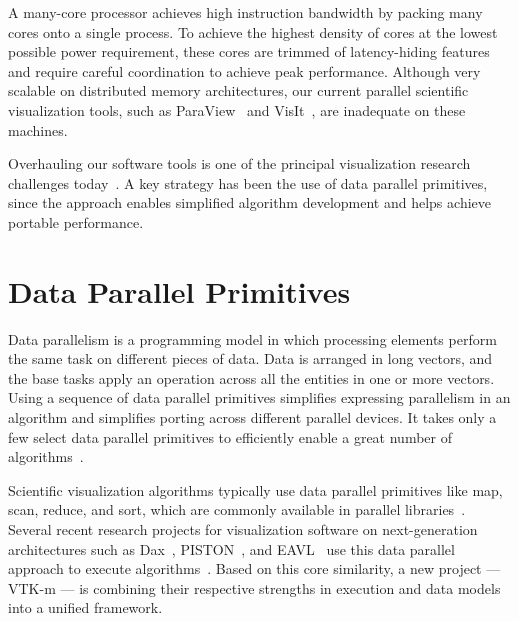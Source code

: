 \documentclass{superfri}
\newcommand*{\lcite}[1]{~\cite{#1}}
\newcommand{\fix}[1]{{\color{red}\textsc{[#1]}}}
\begin{document}
A many-core processor achieves high instruction bandwidth by packing many
cores onto a single process. To achieve the highest density of cores at the
lowest possible power requirement, these cores are trimmed of
latency-hiding features and require careful coordination to achieve peak
performance. Although very scalable on distributed memory architectures,
our current parallel scientific visualization tools, 
such as ParaView\lcite{ParaView} and VisIt\lcite{VisIt},
 are inadequate on these machines.

Overhauling our software tools is one of the principal visualization
research challenges today\lcite{Childs2013}.
A key strategy has been the use of 
data parallel primitives, since the approach enables
simplified algorithm development and helps achieve portable performance.


\section{Data Parallel Primitives}

\noindent
Data parallelism is a programming model in which processing elements
perform the same task on different pieces of data. Data is arranged in long
vectors, and the base tasks apply an operation across all the entities in
one or more vectors. Using a sequence of data parallel primitives
simplifies expressing parallelism in an algorithm and simplifies porting
across different parallel devices. It takes only a few select data parallel
primitives to efficiently enable a great number of
algorithms\lcite{Blelloch1990}.

Scientific visualization algorithms typically use data parallel primitives
like map, scan, reduce, and sort, which are commonly available in parallel
libraries\lcite{Thrust,TBB}. Several recent research projects for
visualization software on next-generation architectures such as Dax\lcite{DAX},
PISTON\lcite{PISTON}, and EAVL\lcite{EAVL} use this data parallel approach to execute
algorithms\lcite{Sewell2012}. Based on this core similarity, a new project
--- VTK-m ---
is combining their respective strengths in execution and data models into
a unified framework.


\end{document}
